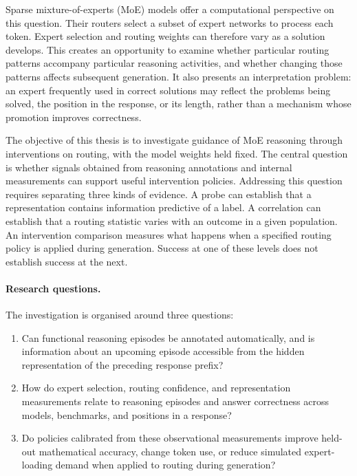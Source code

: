 \documentclass[12pt,a4paper,twoside,openright]{book}
\begin{document}
Sparse mixture-of-experts (MoE) models offer a computational perspective on
this question. Their routers select a subset of expert networks to process
each token. Expert selection and routing weights can therefore vary as a
solution develops. This creates an opportunity to examine whether particular
routing patterns accompany particular reasoning activities, and whether
changing those patterns affects subsequent generation. It also presents an
interpretation problem: an expert frequently used in correct solutions may
reflect the problems being solved, the position in the response, or its
length, rather than a mechanism whose promotion improves correctness.

The objective of this thesis is to investigate guidance of MoE reasoning
through interventions on routing, with the model weights held fixed. The
central question is whether signals obtained from reasoning annotations and
internal measurements can support useful intervention policies. Addressing
this question requires separating three kinds of evidence. A probe can
establish that a representation contains information predictive of a label.
A correlation can establish that a routing statistic varies with an outcome
in a given population. An intervention comparison measures what happens
when a specified routing policy is applied during generation. Success at one
of these levels does not establish success at the next.

\paragraph{Research questions.}
The investigation is organised around three questions:
\begin{enumerate}
  \item Can functional reasoning episodes be annotated automatically, and
  is information about an upcoming episode accessible from the hidden
  representation of the preceding response prefix?
  \item How do expert selection, routing confidence, and representation
  measurements relate to reasoning episodes and answer correctness across
  models, benchmarks, and positions in a response?
  \item Do policies calibrated from these observational measurements
  improve held-out mathematical accuracy, change token use, or reduce
  simulated expert-loading demand when applied to routing during generation?
\end{enumerate}
\end{document}
